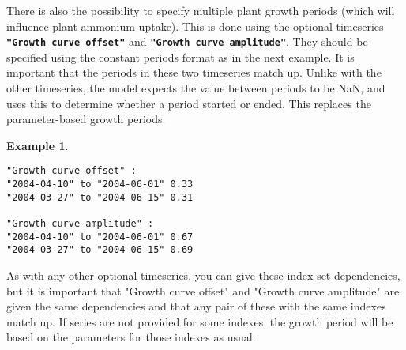\documentclass[11pt]{article}
\theoremstyle{definition}
\newtheorem{myexample}{Example}
\newenvironment{example}%
  {\begin{lrbox}{\examplebox}%
   \begin{minipage}{\dimexpr\linewidth-2\fboxsep}
   \begin{myexample}}%
  {\end{myexample}%
   \end{minipage}%
   \end{lrbox}%
   \begin{trivlist}
     \item[]\colorbox{silver}{\usebox\examplebox}
   \end{trivlist}}
\begin{document}
There is also the possibility to specify multiple plant growth periods (which will influence plant ammonium uptake). This is done using the optional timeseries {\tt\bf "Growth curve offset"} and {\tt\bf "Growth curve amplitude"}. They should be specified using the constant periods format as in the next example. It is important that the periods in these two timeseries match up. Unlike with the other timeseries, the model expects the value between periods to be NaN, and uses this to determine whether a period started or ended. This replaces the parameter-based growth periods.

\begin{example}
\begin{lstlisting}
"Growth curve offset" :
"2004-04-10" to "2004-06-01" 0.33
"2004-03-27" to "2004-06-15" 0.31

"Growth curve amplitude" :
"2004-04-10" to "2004-06-01" 0.67
"2004-03-27" to "2004-06-15" 0.69
\end{lstlisting}
\end{example}

As with any other optional timeseries, you can give these index set dependencies, but it is important that "Growth curve offset" and "Growth curve amplitude" are given the same dependencies and that any pair of these with the same indexes match up. If series are not provided for some indexes, the growth period will be based on the parameters for those indexes as usual.



\end{document}
